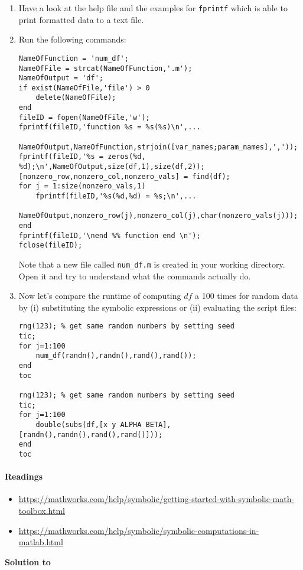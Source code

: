 \begin{enumerate}[resume]

\item
Have a look at the help file and the examples for \texttt{fprintf}
  which is able to print formatted data to a text file.

\item
Run the following commands:
\begin{lstlisting}[style=Matlab-editor,basicstyle=\mlttfamily\scriptsize]
NameOfFunction = 'num_df';
NameOfFile = strcat(NameOfFunction,'.m');
NameOfOutput = 'df';
if exist(NameOfFile,'file') > 0
    delete(NameOfFile);
end
fileID = fopen(NameOfFile,'w');
fprintf(fileID,'function %s = %s(%s)\n',...
          NameOfOutput,NameOfFunction,strjoin([var_names;param_names],','));    
fprintf(fileID,'%s = zeros(%d, %d);\n',NameOfOutput,size(df,1),size(df,2));
[nonzero_row,nonzero_col,nonzero_vals] = find(df);
for j = 1:size(nonzero_vals,1)
    fprintf(fileID,'%s(%d,%d) = %s;\n',... 
          NameOfOutput,nonzero_row(j),nonzero_col(j),char(nonzero_vals(j)));
end
fprintf(fileID,'\nend %% function end \n');
fclose(fileID);
\end{lstlisting}
Note that a new file called \texttt{num{\_}df.m} is created in your working directory.
Open it and try to understand what the commands actually do.

\item
Now let's compare the runtime of computing \(df\) a 100 times for random data by
  (i) substituting the symbolic expressions or (ii) evaluating the script files:
\begin{lstlisting}[style=Matlab-editor,basicstyle=\mlttfamily\scriptsize]
rng(123); % get same random numbers by setting seed
tic;
for j=1:100
    num_df(randn(),randn(),rand(),rand());
end
toc
  
rng(123); % get same random numbers by setting seed
tic;
for j=1:100
    double(subs(df,[x y ALPHA BETA],[randn(),randn(),rand(),rand()]));
end
toc
\end{lstlisting}

\end{enumerate}

\paragraph{Readings}

{\scriptsize
\begin{itemize}
\item \url{https://mathworks.com/help/symbolic/getting-started-with-symbolic-math-toolbox.html}
\item \url{https://mathworks.com/help/symbolic/symbolic-computations-in-matlab.html}
\end{itemize}
}

\begin{solution}\textbf{Solution to }
\ifDisplaySolutions%

\fi
\newpage
\end{solution}